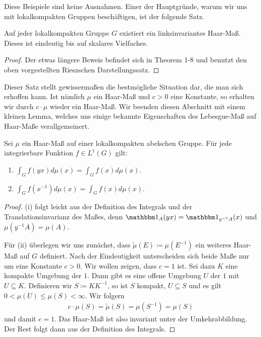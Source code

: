 	Diese Beispiele sind keine Ausnahmen.
	Einer der Hauptgründe, warum wir uns mit lokalkompakten Gruppen beschäftigen, ist der folgende Satz.
	\begin{satz}
	\label{satz:topo:haarmeasure}
		Auf jeder lokalkompakten Gruppe $G$ existiert ein linksinvariantes Haar-Maß. Dieses ist eindeutig bis auf skalares Vielfaches.
	\end{satz}
	\begin{proof}
		Der etwas längere Beweis befindet sich in \textcite{rama} Theorem 1-8 und benutzt den oben vorgestellten Rieszschen Darstellungssatz.
	\end{proof}
	Dieser Satz stellt gewissermaßen die bestmögliche Situation dar, die man sich erhoffen kann. 
	Ist nämlich $\mu$ ein Haar-Maß und $c>0$ eine Konstante, so erhalten wir durch $c\cdot \mu$ wieder ein Haar-Maß. 
	Wir beenden diesen Abschnitt mit einem kleinen Lemma, welches uns einige bekannte Eigenschaften des Lebesgue-Maß auf Haar-Maße verallgemeinert.
	\begin{lemma}
		Sei $\mu$ ein Haar-Maß auf einer lokalkompakten abelschen Gruppe. 
		Für jede integrierbare Funktion $f\in L^{1}(G)$ gilt:
		\begin{multicols}{2}
			\begin{enumerate}[label=(\roman*)]
				\item $\int_{G} f(yx)d\mu(x) = \int_{G} f(x)d\mu(x)$.
				\item $\int_{G} f(x^{-1})d\mu(x) = \int_{G} f(x)d\mu(x)$.
			\end{enumerate}
		\end{multicols}
	\end{lemma}
	\begin{proof}
		(i) folgt leicht aus der Definition des Integrals und der Translationsinvarianz des Maßes, denn $\ind_A(yx) = \ind_{y^{-1}A}(x)$ und $\mu({y^{-1}A}) = \mu(A)$.
		
		Für (ii) überlegen wir uns zunächst, dass $\tilde{\mu}(E)\coloneqq \mu(E^{-1})$ ein weiteres Haar-Maß auf $G$ definiert. 
		Nach der Eindeutigkeit unterscheiden sich beide Maße nur um eine Konstante $c > 0$. Wir wollen zeigen, dass $c=1$ ist.
		Sei dazu $K$ eine kompakte Umgebung der $1$. Dann gibt es eine offene Umgebung $U$ der $1$ mit $U \subseteq K$. 
		Definieren wir $S \coloneqq KK^{-1}$, so ist $S$ kompakt, $U \subseteq S$ und es gilt $0 < \mu(U) \leq \mu(S)<\infty$. 
		Wir folgern 
		\begin{align*}
			c\cdot \mu(S) = \tilde{\mu}(S) = \mu(S^{-1}) =\mu(S)
		\end{align*}
		und damit $c=1$. 
		Das Haar-Maß ist also invariant unter der Umkehrabbildung.
		Der Rest folgt dann aus der Definition des Integrals.
	\end{proof}
	
